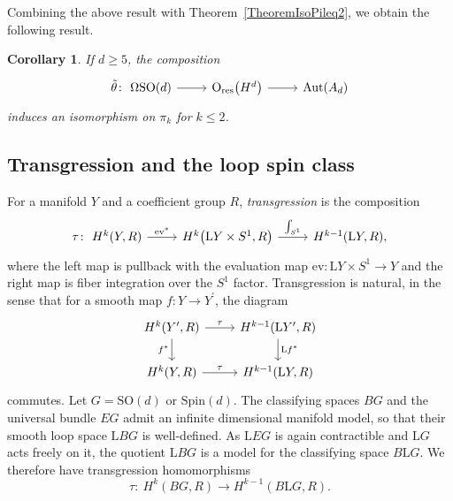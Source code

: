 \documentclass[11pt]{article}
\numberwithin{equation}{section}
\numberwithin{equation}{section}
\newtheorem{Corollary}[Theorem]{Corollary}
\newcommand{\SO}{\mathrm{SO}}
\newcommand{\res}{\mathrm{res}}
\newcommand{\Aut}{\mathrm{Aut}}
\newcommand{\Spin}{\mathrm{Spin}}
\renewcommand{\O}{\mathrm{O}}
\renewcommand{\L}{\mathrm{L}}
\begin{document}
Combining the above result with Theorem~\ref{TheoremIsoPileq2}, we obtain the following result.

\begin{Corollary} \label{CorollaryDoubleIso}
 If $d \geq 5$, the composition
 \begin{equation*}%
 \begin{tikzcd}
 \tilde{\theta}\colon\ \Omega \SO(d) \ar[r] & \O_{\res}\big(H^d\big) \ar[r] & \Aut(A_d)
 \end{tikzcd}
 \end{equation*}
 induces an isomorphism on $\pi_k$ for $k \leq 2$.
\end{Corollary}



\subsection{Transgression and the loop spin class}
\label{SectionTransgression}

For a manifold $Y$ and a coefficient group $R$, \emph{transgression} is the composition
\begin{equation*}
\begin{tikzcd}
 \tau\colon\ H^k(Y, R) \ar[r, "\mathrm{ev}^*"] & H^k\big(\L Y \times S^1, R\big) \ar[r, "\int_{S^1}"] & H^{k-1}(\L Y, R),
\end{tikzcd}
\end{equation*}
where the left map is pullback with the evaluation map $\mathrm{ev}\colon \L Y \times S^1 \to Y$ and the right map is fiber integration over the $S^1$ factor.
Transgression is natural, in the sense that for a smooth map $f\colon Y \to Y^\prime$, the diagram
\begin{equation*}%
 \begin{tikzcd}
 H^k(Y^\prime, R) \ar[d, "f^*"'] \ar[r, "\tau"] & H^{k-1}(\L Y^\prime, R) \ar[d, "\L f^*"] \\
H^k(Y, R) \ar[r, "\tau"] & H^{k-1}(\L Y, R)
 \end{tikzcd}
\end{equation*}
commutes. Let $G = \SO(d)$ or $\Spin(d)$.
The classifying spaces $BG$ and the universal bundle $EG$ admit an infinite dimensional manifold model, so that their smooth loop space $\L BG$ is well-defined.
As $\L EG$ is again contractible and $\L G$ acts freely on it, the quotient $\L BG$ is a model for the classifying space $B \L G$.
We therefore have transgression homomorphisms
\begin{equation*}
 \tau\colon\ H^k(BG, R) \longrightarrow H^{k-1}(B\L G, R).
\end{equation*}
\end{document}
